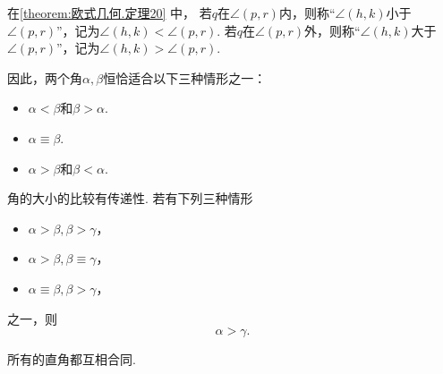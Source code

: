 \begin{figure}[ht]
	\centering
	\caption{}
	\label{figure:欧式几何.图20}
\end{figure}

\begin{definition}
在\cref{theorem:欧式几何.定理20} 中，
若\(q\)在\(\angle(p,r)\)内，则称“\(\angle(h,k)\)小于\(\angle(p,r)\)”，记为\(\angle(h,k) < \angle(p,r)\).
若\(q\)在\(\angle(p,r)\)外，则称“\(\angle(h,k)\)大于\(\angle(p,r)\)”，记为\(\angle(h,k) > \angle(p,r)\).
\end{definition}

因此，两个角\(\alpha,\beta\)恒恰适合以下三种情形之一：
\begin{itemize}
	\item \(\alpha<\beta\)和\(\beta>\alpha\).
	\item \(\alpha\equiv\beta\).
	\item \(\alpha>\beta\)和\(\beta<\alpha\).
\end{itemize}

角的大小的比较有传递性.
若有下列三种情形
\begin{itemize}
	\item \(\alpha>\beta,\beta>\gamma\)，
	\item \(\alpha>\beta,\beta\equiv\gamma\)，
	\item \(\alpha\equiv\beta,\beta>\gamma\)，
\end{itemize}
之一，则\[
	\alpha>\gamma.
\]

\begin{theorem}\label{theorem:欧式几何.定理21}
所有的直角都互相合同.
\end{theorem}


